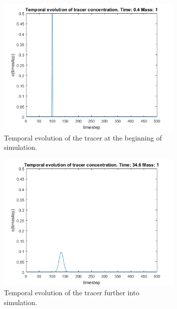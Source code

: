 \documentclass[12pt]{article}
\begin{document}
\begin{figure}[H]
	\centering
	\begin{subfigure}[b]{0.8\textwidth}   
		\centering 
		\includegraphics[width=\textwidth]{temporal1}
		{{\small Temporal evolution of the tracer at the beginning of simulation.}}    
	\end{subfigure}
	\begin{subfigure}[b]{0.8\textwidth}   
		\centering 
		\includegraphics[width=\textwidth]{temporal2}
		{{\small Temporal evolution of the tracer further into simulation.}}    
	\end{subfigure}
\end{figure}
\end{document}
